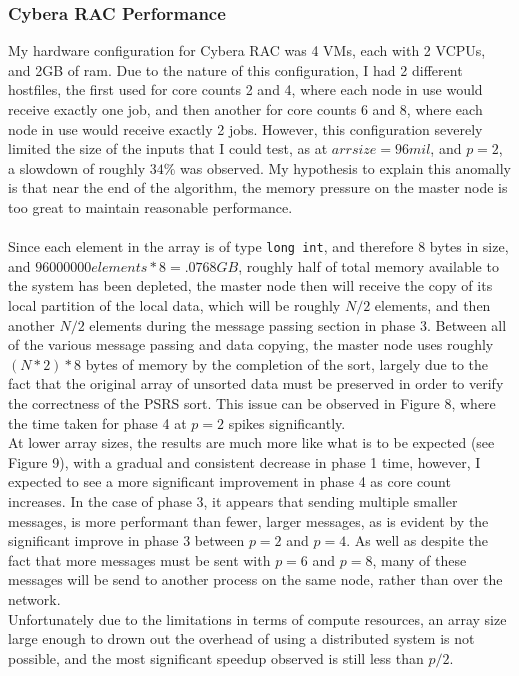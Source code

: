 \documentclass[11pt]{report}
\begin{document}
\subsubsection*{Cybera RAC Performance}
My hardware configuration for Cybera RAC was 4 VMs, each with 2 VCPUs, and 2GB of ram. Due to the nature of this configuration, I had 2 different hostfiles, the first used 
for core counts 2 and 4, where each node in use would receive exactly one job, and then another for core counts 6 and 8, where each node in use would receive exactly 2 jobs.
However, this configuration severely limited the size of the inputs that I could test, as at $arr size=96mil$, and $p=2$, a slowdown of roughly $34\%$ was observed. My
hypothesis to explain this anomally is that near the end of the algorithm, the memory pressure on the master node is too great to maintain reasonable performance.\\\\
Since each element in the array is of type \verb|long int|, and therefore 8 bytes in size, and $96000000 elements * 8 = .0768 GB$, roughly half of total memory available to the 
system has been depleted, the master node then will receive the copy of its local partition of the local data, which will be roughly $N/2$ elements, and then another $N/2$
elements during the message passing section in phase 3. Between all of the various message passing and data copying, the master node uses roughly $(N*2) * 8$ bytes of 
memory by the completion of the sort, largely due to the fact that the original array of unsorted data must be preserved in order to verify the correctness of the
PSRS sort. This issue can be observed in Figure 8, where the time taken for phase 4 at $p=2$ spikes significantly.\\
At lower array sizes, the results are much more like what is to be expected (see Figure 9), with a gradual and consistent decrease in phase 1 time, however, I expected to see a more significant improvement in phase 4 as core count increases. In the case of phase 3, it appears that sending multiple smaller
messages, is more performant than fewer, larger messages, as is evident by the significant improve in phase 3 between $p=2$ and $p=4$. As well as despite the fact that more
messages must be sent with $p=6$ and $p=8$, many of these messages will be send to another process on the same node, rather than over the network.\\
Unfortunately due to the limitations in terms of compute resources, an array size large enough to drown out the overhead of using a distributed system is not possible, and the most significant speedup observed is still less than $p/2$.
\end{document}
